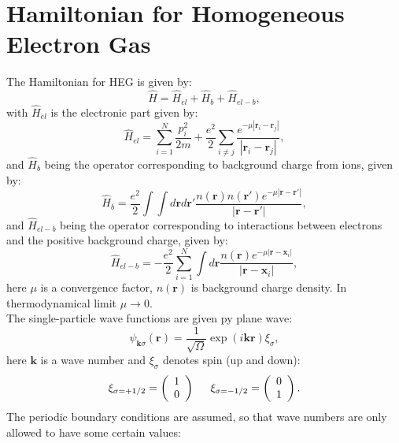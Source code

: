 \section{Hamiltonian for Homogeneous Electron Gas}
The Hamiltonian for HEG is given by:
\begin{equation}
\hat{H}=\hat{H}_{el}+\hat{H}_{b}+\hat{H}_{el-b},
\end{equation}
with $\hat{H}_{el}$ is the electronic part given by:
\begin{equation}
\hat{H}_{el}=\sum_{i=1}^N\frac{p_i^2}{2m}+\frac{e^2}{2}\sum_{i\ne j}\frac{e^{-\mu |\mathbf{r}_i-\mathbf{r}_j|}}{|\mathbf{r}_i-\mathbf{r}_j|},
\end{equation}
and $\hat{H}_{b}$ being the operator corresponding to background charge from ions, given by:
\begin{equation}
\hat{H}_{b}=\frac{e^2}{2}\int\int d\mathbf{r}d\mathbf{r}'\frac{n(\mathbf{r})n(\mathbf{r}')e^{-\mu |\mathbf{r}-\mathbf{r}'|}}{|\mathbf{r}-\mathbf{r}'|},
\end{equation}
and $\hat{H}_{el-b}$ being the operator corresponding to interactions between electrons and the positive background charge, given by:
\begin{equation}
\hat{H}_{el-b}=-\frac{e^2}{2}\sum_{i=1}^N\int d\mathbf{r}\frac{n(\mathbf{r})e^{-\mu |\mathbf{r}-\mathbf{x}_i|}}{|\mathbf{r}-\mathbf{x}_i|},
\end{equation}
here $\mu$ is a convergence factor, $n(\textbf{r})$ is background charge density. In thermodynamical limit $\mu \rightarrow 0$. \\
The single-particle wave functions are given py plane wave:
\begin{equation}
\psi_{\mathbf{k}\sigma}(\mathbf{r})= \frac{1}{\sqrt{\Omega}}\exp{(i\mathbf{kr})}\xi_{\sigma},
\end{equation}
here $\mathbf{k}$ is a wave number and $\xi_{\sigma}$ denotes spin (up and down):
\begin{equation}
\xi_{\sigma=+1/2}=\left(\begin{array}{c} 1 \\ 0 \end{array}\right) \hspace{0.5cm}
\xi_{\sigma=-1/2}=\left(\begin{array}{c} 0 \\ 1 \end{array}\right).
\end{equation}
The periodic boundary conditions are assumed, so that wave numbers are only allowed to have some certain values:
